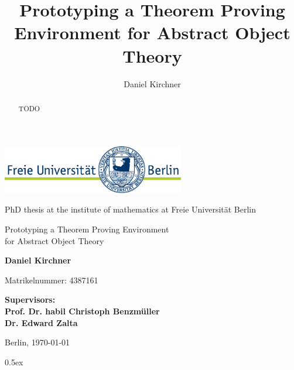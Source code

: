 \documentclass[a4paper,enabledeprecatedfontcommands,abstract=on,twoside=true,bibliography=totoc]{scrreprt}
\title{Prototyping a Theorem Proving Environment for Abstract Object Theory}
\author{Daniel Kirchner}
\numberwithin{TODO}{chapter}
\numberwithin{equation}{section}
\begin{document}
\begin{titlepage}
\vspace{1cm}

\begin{center}
    \includegraphics[width=0.6\textwidth]{logo}
    \vspace{1cm}


PhD thesis at the institute of mathematics at Freie Universit\"at Berlin

    \vspace{2cm}


    \Large{\textsf{Prototyping a Theorem Proving Environment\\ for Abstract Object Theory}}

    \vspace{2cm}

    \large{\textbf{Daniel Kirchner}}

	\vspace{0.25cm}

	\small{Matrikelnummer: 4387161}

    \vspace{2cm}

    \large{\textbf{
        Supervisors:\\
Prof. Dr. habil Christoph Benzm\"uller\\
Dr. Edward Zalta
    }}

    \vspace{2cm}
    \large{Berlin, \today}
\end{center}
\end{titlepage}

\cleardoublepage

\begin{abstract}
TODO
\end{abstract}

\cleardoublepage

\tableofcontents

\cleardoublepage

\parindent 0pt\parskip 0.5ex





\appendix
\setcounter{secnumdepth}{3}
\end{document}
